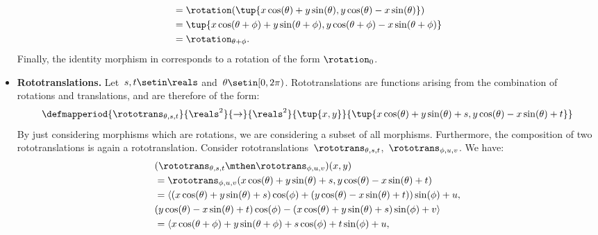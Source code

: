\begin{solution}
\begin{itemize}
\begin{equation}
\begin{aligned}
                       & =\rotation(\tup{x\cos(\theta)+y\sin(\theta), y\cos(\theta)-x\sin(\theta)}) \\
                       & =\tup{x\cos(\theta+\phi)+y\sin(\theta+\phi), y\cos(\theta+\phi)-x\sin(\theta+\phi)} \\
                       & =\rotation_{\theta+\phi}.
                  \end{aligned}
              \end{equation}
              Finally, the identity morphism in \Draw corresponds to a rotation of the form $\rotation_{0}$.
        \item \textbf{Rototranslations.}
              Let~$s,t\setin \reals$ and~$\theta \setin [0,2\pi)$.
              Rototranslations are functions arising from the combination of rotations and translations, and are therefore of the form:
              \begin{equation}
                  \defmapperiod{
                      \rototrans_{\theta,s,t}
                  }{
                      \reals^2
                  }{
                      \to
                  }{
                      \reals^2
                  }{
                      \tup{x,y}
                  }{
                      \tup{x\cos(\theta)+y\sin(\theta)+s, y\cos(\theta)-x\sin(\theta)+t}
                  }
              \end{equation}
              By just considering morphisms which are rotations, we are considering a subset of all morphisms.
              Furthermore, the composition of two rototranslations is again a rototranslation.
              Consider rototranslations~$\rototrans_{\theta,s,t}$,~$\rototrans_{\phi,u,v}$.
              We have:
              \begin{equation}
                  \begin{aligned}
                       & (\rototrans_{\theta,s,t}\mthen \rototrans_{\phi,u,v})(x,y) \\
                       & =\rototrans_{\phi,u,v}(x\cos(\theta)+y\sin(\theta)+s, y\cos(\theta)-x\sin(\theta)+t) \\
                       & =\langle(x\cos(\theta)+y\sin(\theta)+s)\cos(\phi)+(y\cos(\theta)-x\sin(\theta)+t))\sin(\phi)+u, \\
                       & (y\cos(\theta)-x\sin(\theta)+t)\cos(\phi) - (x\cos(\theta)+y\sin(\theta)+s)\sin(\phi)+v\rangle \\
                       & =\langle x\cos(\theta+\phi)+y\sin(\theta+\phi)+s\cos(\phi)+t\sin(\phi)+u, \\

\end{aligned}
\end{equation}
\end{itemize}
\end{solution}
